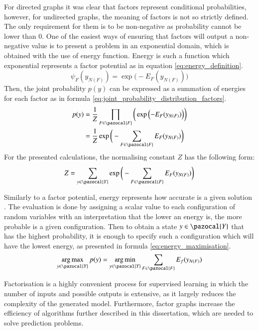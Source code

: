 For directed graphs it was clear that factors represent conditional probabilities, however, for undirected graphs, the meaning of factors is not so strictly defined. The only requirement for them is to be non-negative as probability cannot be lower than 0. One of the easiest ways of ensuring that factors will output a non-negative value is to present a problem in an exponential domain, which is obtained with the use of energy function. Energy is such a function which exponential represents a factor potential as in equation \ref{eq:energy_definition}.
\begin{equation}
    \label{eq:energy_definition}
    \psi_{F}(y_{N(F)}) = \exp{\Big(-E_F(y_{N(F)})\Big)}
\end{equation}
Then, the joint probability $p(y)$ can be expressed as a summation of energies for each factor as in formula \ref{eq:joint_probability_distribution_factors}.
\begin{equation}
\begin{aligned}
    \label{eq:joint_probability_distribution_factors}
     p(y) &=\frac{1}{Z}\prod_{F\in \pazocal{F}}\bigg(\exp\Big({-E_F(y_{N(F)})}\Big)\bigg) \\
     & =\frac{1}{Z}\exp\bigg(-\sum_{F \in \pazocal{F}}{E_F(y_{N(F)})}\bigg)
\end{aligned}
\end{equation}
For the presented calculations, the normalising constant $Z$ has the following form:
\begin{equation}
    Z=\sum_{y\in \pazocal{Y}}\exp\bigg(-\sum_{F \in \pazocal{F}}{E_F(y_{N(F)})\bigg)}
\end{equation}

Similarly to a factor potential, energy represents how accurate is a given solution \cite{factor_graphs_chopra}. The evaluation is done by assigning a scalar value to each configuration of random variables with an interpretation that the lower an energy is, the more probable is a given configuration. Then to obtain a state $y \in \pazocal{Y}$ that has the highest probability, it is enough to specify such a configuration which will have the lowest energy, as presented in formula \ref{eq:energy_maximisation}.
\begin{equation}
    \label{eq:energy_maximisation}
    \argmax_{y \in \pazocal{Y}}{p(y)} = \argmin_{y \in \pazocal{Y}} \sum_{F\in \pazocal{F}} {E_f}({y_{N(F)}})
\end{equation}

Factorisation is a highly convenient process for supervised learning in which the number of inputs and possible outputs is extensive, as it largely reduces the complexity of the generated model. Furthermore,  factor graphs increase the efficiency of algorithms further described in this dissertation, which are needed to solve prediction problems. 



